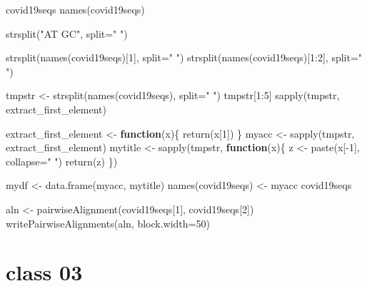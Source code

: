 \documentclass[
]{book}
\newenvironment{Shaded}{\begin{snugshade}}{\end{snugshade}}
\newcommand{\AttributeTok}[1]{\textcolor[rgb]{0.77,0.63,0.00}{#1}}
\newcommand{\ControlFlowTok}[1]{\textcolor[rgb]{0.13,0.29,0.53}{\textbf{#1}}}
\newcommand{\DecValTok}[1]{\textcolor[rgb]{0.00,0.00,0.81}{#1}}
\newcommand{\FunctionTok}[1]{\textcolor[rgb]{0.00,0.00,0.00}{#1}}
\newcommand{\NormalTok}[1]{#1}
\newcommand{\OtherTok}[1]{\textcolor[rgb]{0.56,0.35,0.01}{#1}}
\newcommand{\SpecialCharTok}[1]{\textcolor[rgb]{0.00,0.00,0.00}{#1}}
\newcommand{\StringTok}[1]{\textcolor[rgb]{0.31,0.60,0.02}{#1}}
\begin{document}
\begin{Shaded}
\begin{Highlighting}[]
\NormalTok{covid19seqs}
\FunctionTok{names}\NormalTok{(covid19seqs)}

\FunctionTok{strsplit}\NormalTok{(}\StringTok{"AT GC"}\NormalTok{, }\AttributeTok{split=}\StringTok{" "}\NormalTok{)}

\FunctionTok{strsplit}\NormalTok{(}\FunctionTok{names}\NormalTok{(covid19seqs)[}\DecValTok{1}\NormalTok{], }\AttributeTok{split=}\StringTok{" "}\NormalTok{)}
\FunctionTok{strsplit}\NormalTok{(}\FunctionTok{names}\NormalTok{(covid19seqs)[}\DecValTok{1}\SpecialCharTok{:}\DecValTok{2}\NormalTok{], }\AttributeTok{split=}\StringTok{" "}\NormalTok{)}

\NormalTok{tmpstr }\OtherTok{\textless{}{-}} \FunctionTok{strsplit}\NormalTok{(}\FunctionTok{names}\NormalTok{(covid19seqs), }\AttributeTok{split=}\StringTok{" "}\NormalTok{)}
\NormalTok{tmpstr[}\DecValTok{1}\SpecialCharTok{:}\DecValTok{5}\NormalTok{]}
\FunctionTok{sapply}\NormalTok{(tmpstr, extract\_first\_element)}

\NormalTok{extract\_first\_element }\OtherTok{\textless{}{-}} \ControlFlowTok{function}\NormalTok{(x)\{}
  \FunctionTok{return}\NormalTok{(x[}\DecValTok{1}\NormalTok{])}
\NormalTok{\}}
\NormalTok{myacc }\OtherTok{\textless{}{-}} \FunctionTok{sapply}\NormalTok{(tmpstr, extract\_first\_element)}
\NormalTok{mytitle }\OtherTok{\textless{}{-}} \FunctionTok{sapply}\NormalTok{(tmpstr, }\ControlFlowTok{function}\NormalTok{(x)\{}
\NormalTok{  z }\OtherTok{\textless{}{-}} \FunctionTok{paste}\NormalTok{(x[}\SpecialCharTok{{-}}\DecValTok{1}\NormalTok{], }\AttributeTok{collapse=}\StringTok{" "}\NormalTok{)}
  \FunctionTok{return}\NormalTok{(z)}
\NormalTok{  \})}

\NormalTok{mydf }\OtherTok{\textless{}{-}} \FunctionTok{data.frame}\NormalTok{(myacc, mytitle)}
\FunctionTok{names}\NormalTok{(covid19seqs) }\OtherTok{\textless{}{-}}\NormalTok{ myacc}
\NormalTok{covid19seqs}

\NormalTok{aln }\OtherTok{\textless{}{-}} \FunctionTok{pairwiseAlignment}\NormalTok{(covid19seqs[}\DecValTok{1}\NormalTok{], covid19seqs[}\DecValTok{2}\NormalTok{])}
\FunctionTok{writePairwiseAlignments}\NormalTok{(aln, }\AttributeTok{block.width=}\DecValTok{50}\NormalTok{)}
\end{Highlighting}
\end{Shaded}

\hypertarget{class-03-3}{%
\section{class 03}\label{class-03-3}}
\end{document}
